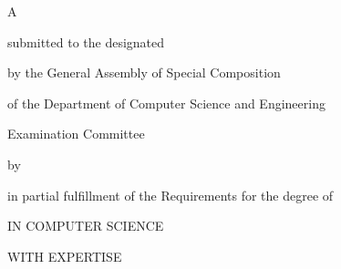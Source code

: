 \makeatletter

{\LARGE \@title}

{\Large
	\vfill \vfill A \csethesisTypeEn

	\vfill        submitted to the designated

	\vfill        by the General Assembly of Special Composition

	              of the Department of Computer Science and Engineering

	              Examination Committee

	\vfill        by

	\vfill        {\LARGE \@author}

	\vfill        in partial fulfillment of the Requirements for the degree of

	\vfill        \csediplwmaEn

	\ifPhD\else
	              IN COMPUTER SCIENCE

		          WITH EXPERTISE

		          \@Ekseidikseusi
	\fi

	\vfill \vfill \@date
}

\makeatother
\clearpage
